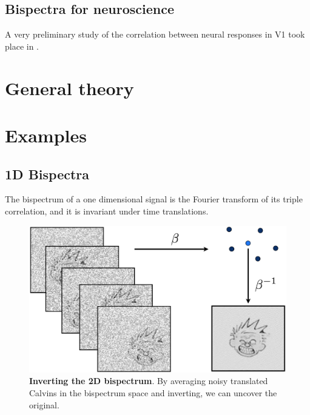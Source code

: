 \documentclass[letterpaper, 10pt]{article}
\theoremstyle{definition}
\begin{document}
\subsection{Bispectra for neuroscience}

A very preliminary study of the correlation between neural responses in V1 took place in \cite{Mudigonda13}.



\section{General theory}
\label{Sec:General}


\section{Examples}

\subsection{1D Bispectra}

The bispectrum of a one dimensional signal is the Fourier transform of its triple correlation, and it is invariant under time translations.



\begin{figure}
\begin{center}
\includegraphics[width=.9 \linewidth]{figs/calvin_inv_bispectrum.png} 
\caption{\textbf{Inverting the 2D bispectrum}. By averaging noisy translated Calvins in the bispectrum space and inverting, we can uncover the original.}
\label{bispetrum_invert_calvin}
\end{center}
\end{figure}


% 
\end{document}
